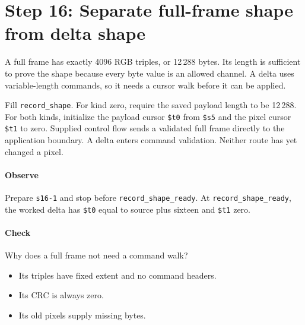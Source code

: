 \section{Step 16: Separate full-frame shape from delta shape}
A full frame has exactly 4096 RGB triples, or 12\,288 bytes. Its length is
sufficient to prove the shape because every byte value is an allowed channel.
A delta uses variable-length commands, so it needs a cursor walk before it can
be applied.

Fill \texttt{record\_shape}. For kind zero, require the saved payload length to
be 12\,288. For both kinds, initialize the payload cursor \texttt{\$t0} from
\texttt{\$s5} and the pixel cursor \texttt{\$t1} to zero. Supplied control
flow sends a validated full frame directly to the application boundary. A delta
enters command validation. Neither route has yet changed a pixel.

\paragraph{Observe} Prepare \texttt{s16-1} and stop before
\texttt{record\_shape\_ready}. At \texttt{record\_shape\_ready}, the worked delta has
\texttt{\$t0} equal to source plus sixteen and \texttt{\$t1} zero.

\paragraph{Check} Why does a full frame not need a command walk?
\begin{itemize}
\item[A.] Its triples have fixed extent and no command headers.
\item[B.] Its CRC is always zero.
\item[C.] Its old pixels supply missing bytes.
\end{itemize}
